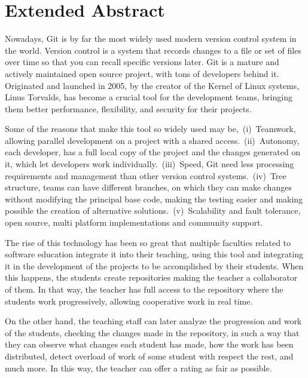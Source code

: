 \chapter*{Extended Abstract\label{00Abstractsummary}}


Nowadays, Git\cite{git} is by far the most widely used modern version
control system in the world. Version control is a system that records
changes to a file or set of files over time so that you can recall
specific versions later. Git is a mature and actively maintained open
source project, with tons of developers behind it. Originated and
launched in 2005, by the creator of the Kernel of Linux systems, Linus
Torvalds, has become a crucial tool for the development teams,
bringing them better performance, flexibility, and security for their
projects.

Some of the reasons that make this tool so widely used may
be,~(i)~Teamwork, allowing parallel development on a project with a shared
access.~(ii)~Autonomy, each developer, has a full local copy of the project
and the changes generated on it, which let developers work
individually.~(iii)~Speed, Git need less processing requirements and
management than other version control systems.~(iv)~Tree structure, teams
can have different branches, on which they can make changes without
modifying the principal base code, making the testing easier and making
possible the creation of alternative solutions.~(v)~Scalability and fault
tolerance, open source, multi platform implementations and community
support.

The rise of this technology has been so great that multiple faculties
related to software education integrate it into their teaching, using this
tool and integrating it in the development of the projects to be
accomplished by their students. When this happens, the students create
repositories making the teacher a collaborator of them. In that way, the
teacher has full access to the repository where the students work
progressively, allowing cooperative work in real time.

On the other hand, the teaching staff can later analyze the progression and
work of the students, checking the changes made in the repository, in such
a way that they can observe what changes each student has made, how the
work has been distributed, detect overload of work of some student with
respect the rest, and much more. In this way, the teacher can offer a rating
as fair as possible.


